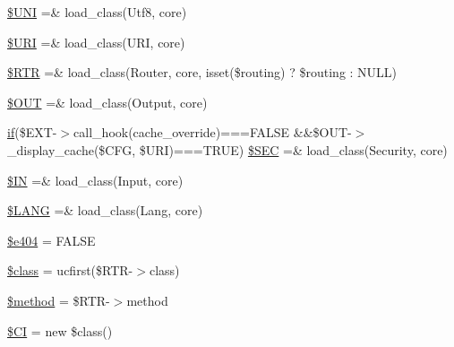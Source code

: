 \begin{DoxyCompactItemize}
\hyperlink{system_2core_2_code_igniter_8php_a2060dabd8d00b5b0539bd041bf450924}{\$\+U\+N\+I} =\& load\+\_\+class(\textquotesingle{}Utf8\textquotesingle{}, \textquotesingle{}core\textquotesingle{})
\item 
\hyperlink{system_2core_2_code_igniter_8php_a630d83d898b39ad4568906284f7f5336}{\$\+U\+R\+I} =\& load\+\_\+class(\textquotesingle{}U\+R\+I\textquotesingle{}, \textquotesingle{}core\textquotesingle{})
\item 
\hyperlink{system_2core_2_code_igniter_8php_a4d6c9285c8483e4708a57a4128fc95f3}{\$\+R\+T\+R} =\& load\+\_\+class(\textquotesingle{}Router\textquotesingle{}, \textquotesingle{}core\textquotesingle{}, isset(\$routing) ? \$routing \+: N\+U\+L\+L)
\item 
\hyperlink{system_2core_2_code_igniter_8php_ad437402616c81c82c746f09854b23729}{\$\+O\+U\+T} =\& load\+\_\+class(\textquotesingle{}Output\textquotesingle{}, \textquotesingle{}core\textquotesingle{})
\item 
\hyperlink{_admin_2assets_2js_2bootstrap_8min_8js_a87cf461060832b8b68a7b48d9e371e4f}{if}(\$E\+X\+T-\/$>$call\+\_\+hook(\textquotesingle{}cache\+\_\+override\textquotesingle{})===F\+A\+L\+S\+E \&\&\$O\+U\+T-\/$>$\+\_\+display\+\_\+cache(\$C\+F\+G, \$U\+R\+I)===T\+R\+U\+E) \hyperlink{system_2core_2_code_igniter_8php_af78ce53fb82103e1165678dd2d3385a4}{\$\+S\+E\+C} =\& load\+\_\+class(\textquotesingle{}Security\textquotesingle{}, \textquotesingle{}core\textquotesingle{})
\item 
\hyperlink{system_2core_2_code_igniter_8php_a66d076d48aff75a01bb726f5bdd94d46}{\$\+I\+N} =\& load\+\_\+class(\textquotesingle{}Input\textquotesingle{}, \textquotesingle{}core\textquotesingle{})
\item 
\hyperlink{system_2core_2_code_igniter_8php_afab4eb732acc05cebf41e0afce18681c}{\$\+L\+A\+N\+G} =\& load\+\_\+class(\textquotesingle{}Lang\textquotesingle{}, \textquotesingle{}core\textquotesingle{})
\item 
\hyperlink{system_2core_2_code_igniter_8php_a20b89fa011927fc498a4a665fa44d061}{\$e404} = F\+A\+L\+S\+E
\item 
\hyperlink{system_2core_2_code_igniter_8php_a252ba022809910ea710a068fc1bab657}{\$class} = ucfirst(\$R\+T\+R-\/$>$class)
\item 
\hyperlink{system_2core_2_code_igniter_8php_a12661b2fc0f57f97e30a1620889ce9c6}{\$method} = \$R\+T\+R-\/$>$method
\item 
\hyperlink{system_2core_2_code_igniter_8php_ae0314d046ddf7fcfaec03222977427d3}{\$\+C\+I} = new \$class()
\end{DoxyCompactItemize}


